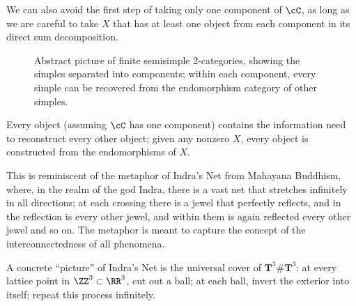 \documentclass[12pt]{article}
\newcommand{\amod}[1]{{#1\textrm{-mod}}}
\begin{document}
We can also avoid the first step of taking only one component
of $\cC$,
as long as we are careful to take $X$
that has at least one object from each component
in its direct sum decomposition.


\begin{figure}
\centering
{}
\caption{Abstract picture of finite semisimple 2-categories,
showing the simples separated into components;
within each component,
every simple can be recovered from the endomorphism category
of other simples.
}
\end{figure}


\begin{remark}
Every object (assuming $\cC$ has one component)
contains the information need to reconstruct every other object;
given any nonzero $X$,
every object is constructed from the endomorphisms of $X$.

This is reminiscent of the metaphor of
Indra's Net from Mahayana Buddhism,
where, in the realm of the god Indra,
there is a vast net that stretches infinitely in all directions;
at each crossing there is a jewel that perfectly reflects,
and in the reflection is every other jewel,
and within them is again reflected every other jewel and so on.
The metaphor is meant to capture the concept of the
interconnectedness of all phenomena.

A concrete ``picture'' of Indra's Net is the universal cover
of $\mathbf{T}^3 \# \mathbf{T}^3$:
at every lattice point in $\ZZ^3 \subset \RR^3$,
cut out a ball;
at each ball, invert the exterior into itself;
repeat this process infinitely.
\end{remark}
\end{document}
